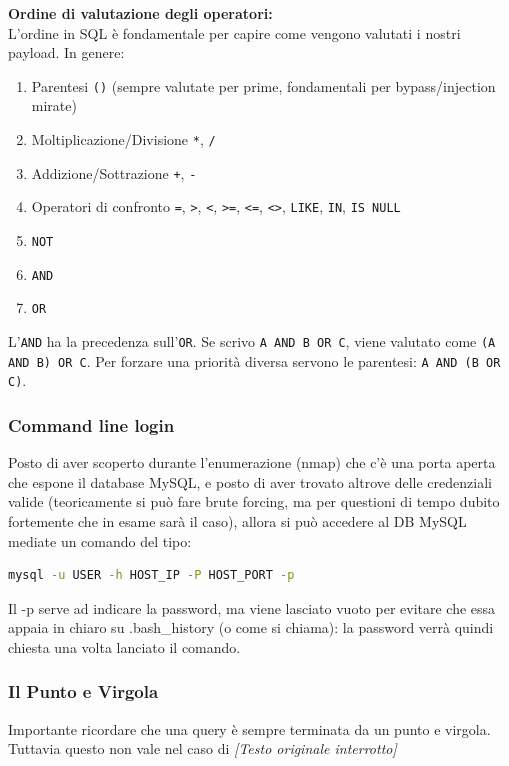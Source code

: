\documentclass[12pt,a4paper]{report}
\begin{document}
	\textbf{Ordine di valutazione degli operatori:}\\
	L'ordine in SQL è fondamentale per capire come vengono valutati i nostri payload. In genere:
	\begin{enumerate}
		\item Parentesi \texttt{()} (sempre valutate per prime, fondamentali per bypass/injection mirate)
		\item Moltiplicazione/Divisione \texttt{*}, \texttt{/}
		\item Addizione/Sottrazione \texttt{+}, \texttt{-}
		\item Operatori di confronto \texttt{=}, \texttt{>}, \texttt{<}, \texttt{>=}, \texttt{<=}, \texttt{<>}, \texttt{LIKE}, \texttt{IN}, \texttt{IS NULL}
		\item \texttt{NOT}
		\item \texttt{AND}
		\item \texttt{OR}
	\end{enumerate}
	\begin{nota}
		L'\texttt{AND} ha la precedenza sull'\texttt{OR}. Se scrivo \texttt{A AND B OR C}, viene valutato come \texttt{(A AND B) OR C}. Per forzare una priorità diversa servono le parentesi: \texttt{A AND (B OR C)}.
	\end{nota}
	
	\subsubsection{Command line login}
	Posto di aver scoperto durante l'enumerazione (nmap) che c'è una porta aperta che espone il database MySQL, e posto di aver trovato altrove delle credenziali valide (teoricamente si può fare brute forcing, ma per questioni di tempo dubito fortemente che in esame sarà il caso), allora si può accedere al DB MySQL mediate un comando del tipo:
	\begin{lstlisting}[language=bash]
		mysql -u USER -h HOST_IP -P HOST_PORT -p
	\end{lstlisting}
	Il -p serve ad indicare la password, ma viene lasciato vuoto per evitare che essa appaia in chiaro su .bash\_history (o come si chiama): la password verrà quindi chiesta una volta lanciato il comando.
	
	\subsubsection{Il Punto e Virgola}
	Importante ricordare che una query è sempre terminata da un punto e virgola. Tuttavia questo non vale nel caso di \textit{[Testo originale interrotto]}
	
\end{document}
